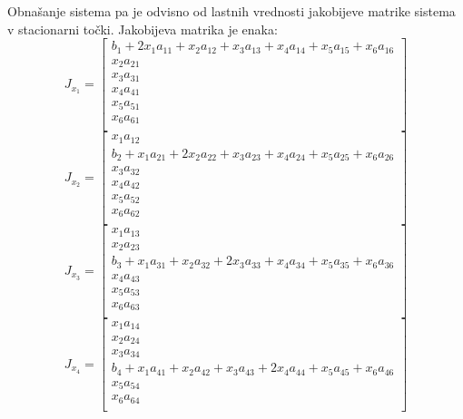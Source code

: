 \documentclass[a4paper, 12pt]{article}
\begin{document}
Obnašanje sistema pa je odvisno od lastnih vrednosti jakobijeve matrike sistema
v stacionarni točki. Jakobijeva matrika je enaka:
\begin{equation}
	J_{x_{1}} =
	\begin{bmatrix}
		b_{1}+2x_{1}a_{11}+x_{2}a_{12}+x_{3}a_{13}+x_{4}a_{14}+x_{5}a_{15}+x_{6}a_{16} \\
		x_{2}a_{21} \\
		x_{3}a_{31} \\
		x_{4}a_{41} \\
		x_{5}a_{51} \\
		x_{6}a_{61} \\
	\end{bmatrix}
\end{equation}
\begin{equation}
	J_{x_{2}} =
	\begin{bmatrix}
		x_{1}a_{12} \\
		b_{2}+x_{1}a_{21}+2x_{2}a_{22}+x_{3}a_{23}+x_{4}a_{24}+x_{5}a_{25}+x_{6}a_{26} \\
		x_{3}a_{32} \\
		x_{4}a_{42} \\
		x_{5}a_{52} \\
		x_{6}a_{62} \\
	\end{bmatrix}
\end{equation}
\begin{equation}
	J_{x_{3}} =
	\begin{bmatrix}
		x_{1}a_{13} \\
		x_{2}a_{23} \\
		b_{3}+x_{1}a_{31}+x_{2}a_{32}+2x_{3}a_{33}+x_{4}a_{34}+x_{5}a_{35}+x_{6}a_{36} \\
		x_{4}a_{43} \\
		x_{5}a_{53} \\
		x_{6}a_{63} \\
	\end{bmatrix}
\end{equation}
\begin{equation}
	J_{x_{4}} =
	\begin{bmatrix}
		x_{1}a_{14} \\
		x_{2}a_{24} \\
		x_{3}a_{34} \\
		b_{4}+x_{1}a_{41}+x_{2}a_{42}+x_{3}a_{43}+2x_{4}a_{44}+x_{5}a_{45}+x_{6}a_{46} \\
		x_{5}a_{54} \\
		x_{6}a_{64} \\
	\end{bmatrix}
\end{equation}
\end{document}
